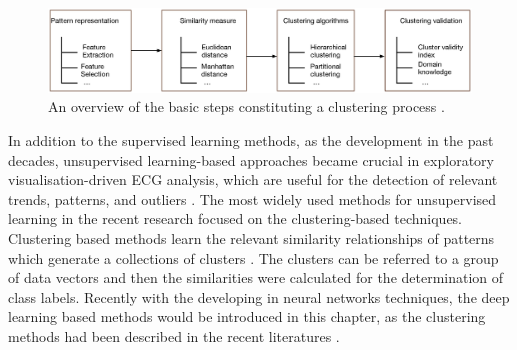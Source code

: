 \documentclass[graybox]{svmult}
\begin{document}

%
\begin{figure}[]
\sidecaption
\includegraphics[scale=.32]{clustering}
%
%
\caption{An overview of the basic steps constituting a clustering process \citep{clifford2006advanced}.}
\label{fig:2}       %
\end{figure}

In addition to the supervised learning methods, as the development in the past decades, unsupervised learning-based approaches became crucial in exploratory visualisation-driven ECG analysis, which are useful for the detection of relevant trends, patterns, and outliers \citep[e.g.][]{silipo1996supervised, lagerholm2000clustering}. 
The most widely used methods for unsupervised learning in the recent research focused on the clustering-based techniques. Clustering based methods learn the relevant similarity relationships of patterns which generate a collections of clusters \citep{bezdek1998some}. The clusters can be referred to a group of data vectors and then the similarities were calculated for the determination of class labels. Recently with the developing in neural networks techniques, the deep learning based methods would be introduced in this chapter, as the clustering methods had been described in the recent literatures \citep[e.g.][]{yeh2012analyzing, rodriguez2012unsupervised}.







\end{document}
